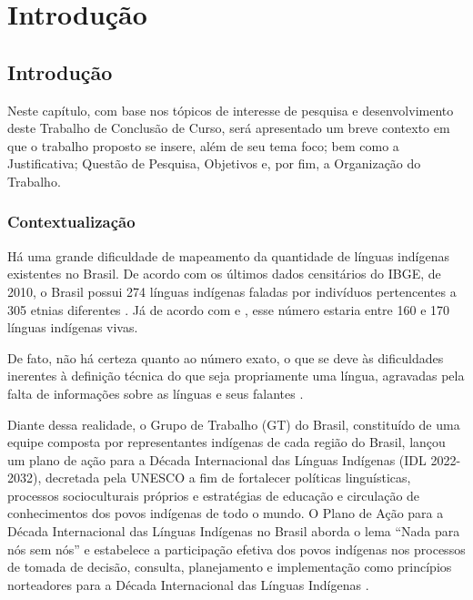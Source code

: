 \setcounter{chapter}{1}
\chapter*[Introdução]{Introdução}
\section{Introdução}

Neste capítulo, com base nos tópicos de interesse de pesquisa e desenvolvimento deste Trabalho de Conclusão de Curso, será apresentado um breve contexto em que o trabalho
proposto se insere, além de seu tema foco; bem como a Justificativa; Questão de Pesquisa, Objetivos e, por fim, a Organização do Trabalho.

\subsection{Contextualização}

Há uma grande dificuldade de mapeamento da quantidade de línguas indígenas existentes no Brasil. De acordo com os últimos dados censitários do IBGE, de 2010, o Brasil
possui 274 línguas indígenas faladas por indivíduos pertencentes a 305 etnias diferentes \cite{ibge}. Já de acordo com \cite{galucioetal2018} e \cite{dangelis2014}, esse
número estaria entre 160 e 170 línguas indígenas vivas.

De fato, não há certeza quanto ao número exato, o que se deve às dificuldades inerentes à definição técnica do que seja propriamente uma língua, agravadas pela falta de
informações sobre as línguas e seus falantes \cite{seki2000}.

Diante dessa realidade, o Grupo de Trabalho (GT) do Brasil, constituído de uma equipe composta por representantes indígenas de cada região do Brasil, lançou um plano de
ação para a Década Internacional das Línguas Indígenas (IDL 2022-2032), decretada pela UNESCO a fim de fortalecer políticas linguísticas, processos socioculturais
próprios e estratégias de educação e circulação de conhecimentos dos povos indígenas de todo o mundo. O Plano de Ação para a Década Internacional das Línguas Indígenas no
Brasil aborda o lema “Nada para nós sem nós” e estabelece a participação efetiva dos povos indígenas nos processos de tomada de decisão, consulta, planejamento e
implementação como princípios norteadores para a Década Internacional das Línguas Indígenas \cite{gtbrasil2021}.

